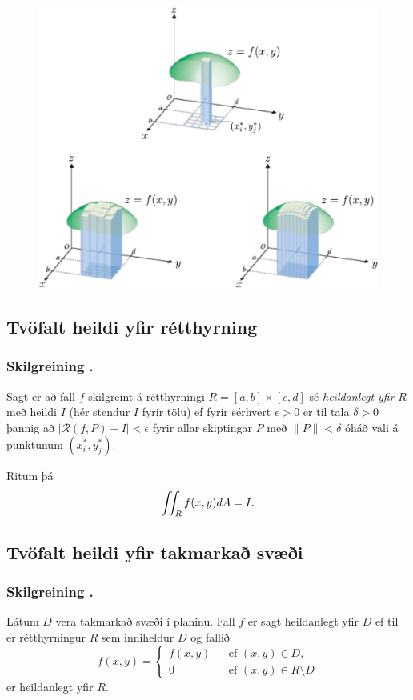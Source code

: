     \begin {figure}[h!]
 \centering
            \includegraphics[width=0.9\linewidth]{double.pdf}
            \caption*{}
\end {figure}



\subsection{\nopagebreak Tvöfalt heildi yfir rétthyrning} 

\subsubsection{\nopagebreak Skilgreining \kaflanr.}
Sagt er að fall $f$ skilgreint á
rétthyrningi $R=[a,b]\times [c,d]$ sé {\em heildanlegt yfir} $R$ með
heildi $I$ (hér stendur $I$ fyrir tölu) ef fyrir sérhvert
$\epsilon>0$ er til tala $\delta>0$ 
þannig að $|\mathcal{R}(f,P)-I|<\epsilon$ fyrir allar skiptingar $P$ með
$\|P\|<\delta$ óháð vali á punktunum $(x_i^*, y_j^*)$.

Ritum þá 
$$\int\!\!\!\int_R f(x,y)dA=I.$$






\subsection{Tvöfalt heildi yfir takmarkað svæði} 

\subsubsection{Skilgreining \kaflanr.}
Látum $D$ vera takmarkað svæði í planinu.
Fall $f$ er sagt heildanlegt yfir $D$ ef til er rétthyrningur $R$ sem
inniheldur $D$ og fallið 
$$\hat{f}(x,y)=\left\{\begin{array}{rcl}
f(x,y)& & \mbox{ef }(x,y)\in D,\\
0& & \mbox{ef }(x,y)\in R\setminus D
\end{array}\right.$$
er heildanlegt yfir $R$.




